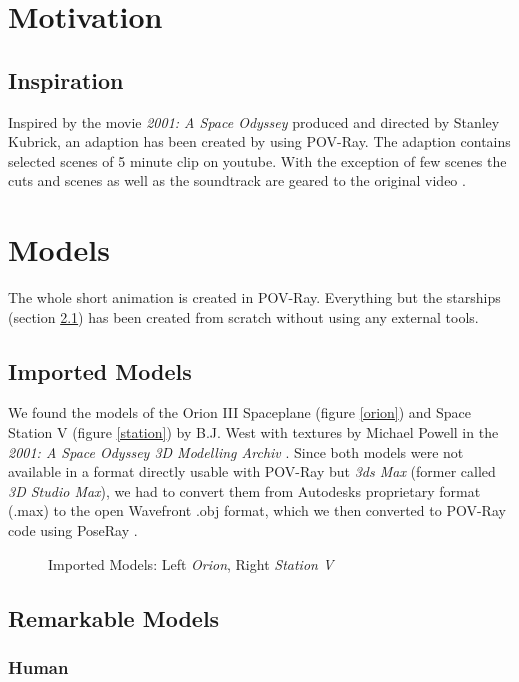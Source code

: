 
\chapter{Motivation}
\section{Inspiration}
Inspired by the movie \textit{2001: A Space Odyssey} produced and directed by Stanley Kubrick, an adaption has been created by using POV-Ray. The adaption contains selected scenes of 5 minute clip on youtube.  With the exception of few scenes the cuts and scenes as well as the soundtrack are geared to the original video \cite{EbClectic}.

\chapter{Models}
The whole short animation is created in POV-Ray. Everything but the starships (section \ref{imported_models}) has been created from scratch without using any external tools.
\section{Imported Models} \label{imported_models}

We found the models of the Orion III Spaceplane (figure \ref{orion}) and Space Station V (figure \ref{station}) by B.J. West with textures by Michael Powell in the \textit{2001: A Space Odyssey 3D Modelling Archiv} \cite{Archive}.
Since both models were not available in a format directly usable with POV-Ray but \textit{3ds Max} (former called \textit{3D Studio Max}), we had to convert them from Autodesks proprietary format (.max) to the open Wavefront .obj format, which we then converted to POV-Ray code using PoseRay \cite{PoseRay}.
\begin{figure} [ht]
	\caption{Imported Models: Left \textit{Orion}, Right \textit{Station V}} 
\end{figure} 

\newpage
\section{Remarkable Models}

\subsection{Human} \label{human_model}

